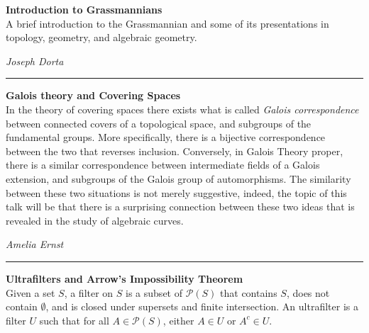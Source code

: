 \documentclass[oneside]{amsart}
\begin{document}
\filbreak
\hspace{-20pt}\textbf{ \textbf{ Introduction to Grassmannians } } \vspace{0.5em}\\
A brief introduction to the Grassmannian and some of its presentations in topology, geometry, and algebraic geometry. \vspace{-1em}\\
\begin{flushright} \textit{ Joseph Dorta } \vspace{0.5em} \end{flushright}
\rule{\textwidth}{0.4pt}
\vspace{0.5em}

\filbreak
\hspace{-20pt}\textbf{ \textbf{ Galois theory and Covering Spaces } } \vspace{0.5em}\\
In the theory of covering spaces there exists what is called \textit{Galois correspondence} between connected covers of a topological space, and subgroups of the fundamental groups. More specifically, there is a bijective correspondence between the two that reverses inclusion. Conversely, in Galois Theory proper, there is a similar correspondence between intermediate fields of a Galois extension, and subgroups of the Galois group of automorphisms. The similarity between these two situations is not merely suggestive, indeed, the topic of this talk will be that there is a surprising connection between these two ideas that is revealed in the study of algebraic curves. \vspace{-1em}\\
\begin{flushright} \textit{ Amelia Ernst } \vspace{0.5em} \end{flushright}
\rule{\textwidth}{0.4pt}
\vspace{0.5em}

\filbreak
\hspace{-20pt}\textbf{ \textbf{ Ultrafilters and Arrow's Impossibility Theorem } } \vspace{0.5em}\\
Given a set $S$, a filter on $S$ is a subset of $\mathcal{P}(S)$ that contains $S$, does not contain $\emptyset$, and is closed under supersets and finite intersection.  An ultrafilter is a filter $U$  such that for all $A \in \mathcal{P}(S)$, either $A \in U$ or $A^{c} \in U$.
\end{document}
